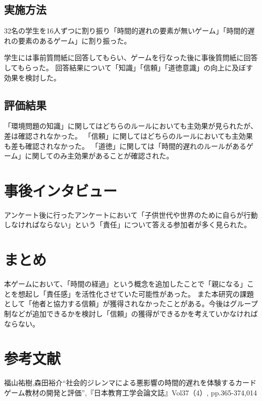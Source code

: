 \documentclass[a4j,11pt]{jsarticle}
\begin{document}
\subsection{実施方法}
\label{sec:kih}
32名の学生を16人ずつに割り振り「時間的遅れの要素が無いゲーム」「時間的遅れの要素のあるゲーム」に割り振った。

学生には事前質問紙に回答してもらい、ゲームを行なった後に事後質問紙に回答してもらった。
回答結果について「知識」「信頼」「道徳意識」の向上に及ぼす効果を検討した。

\subsection{評価結果}
「環境問題の知識」に関してはどちらのルールにおいても主効果が見られたが、差は確認されなかった。
「信頼」に関してはどちらのルールにおいても主効果も差も確認されなかった。
「道徳」に関しては「時間的遅れのルールがあるゲーム」に関してのみ主効果があることが確認された。





\section{事後インタビュー}
アンケート後に行ったアンケートにおいて「子供世代や世界のために自らが行動しなければならない」という「責任」について答える参加者が多く見られた。


\section{まとめ}
\label{sec:mokuteki}
本ゲームにおいて、「時間の経過」という概念を追加したことで「親になる」ことを想起し「責任感」を活性化させていた可能性があった。
また本研究の課題として「他者と協力する信頼」が獲得されなかったことがある。今後はグループ制などが追加できるかを検討し「信頼」の獲得ができるかを考えていかなければならない。

\section{参考文献}
\label{sec:bunken}
福山祐樹,森田裕介“社会的ジレンマによる悪影響の時間的遅れを体験するカードゲーム教材の開発と評価”,『日本教育工学会論文誌』Vol37（4）, pp.365-374,014
  
\end{document}
